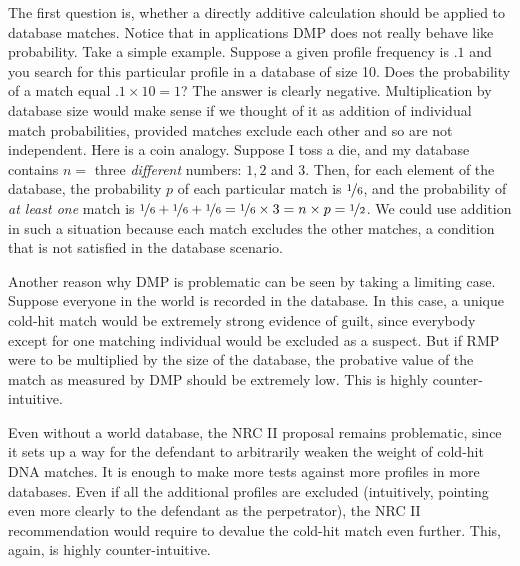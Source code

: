\documentclass[
  10pt,
  dvipsnames,enabledeprecatedfontcommands]{scrartcl}
\begin{document}
The first question is, whether a directly additive calculation should be
applied to database matches. Notice that in applications DMP does not
really behave like probability. Take a simple example. Suppose a given
profile frequency is \(.1\) and you search for this particular profile
in a database of size 10. Does the probability of a match equal
\(.1 \times 10=1\)? The answer is clearly negative. Multiplication by
database size would make sense if we thought of it as addition of
individual match probabilities, provided matches exclude each other and
so are not independent. Here is a coin analogy. Suppose I toss a die,
and my database contains \(n=\) three \emph{different} numbers: \(1, 2\)
and \(3\). Then, for each element of the database, the probability \(p\)
of each particular match is \(\nicefrac{1}{6}\), and the probability of
\emph{at least one} match is
\(\nicefrac{1}{6}+\nicefrac{1}{6}+\nicefrac{1}{6}=\nicefrac{1}{6}\times 3 = n\times p =\nicefrac{1}{2}\).
We could use addition in such a situation because each match excludes
the other matches, a condition that is not satisfied in the database
scenario.

Another reason why DMP is problematic can be seen by taking a limiting
case. Suppose everyone in the world is recorded in the database. In this
case, a unique cold-hit match would be extremely strong evidence of
guilt, since everybody except for one matching individual would be
excluded as a suspect. But if RMP were to be multiplied by the size of
the database, the probative value of the match as measured by DMP should
be extremely low. This is highly counter-intuitive.

Even without a world database, the NRC II proposal remains problematic,
since it sets up a way for the defendant to arbitrarily weaken the
weight of cold-hit DNA matches. It is enough to make more tests against
more profiles in more databases. Even if all the additional profiles are
excluded (intuitively, pointing even more clearly to the defendant as
the perpetrator), the NRC II recommendation would require to devalue the
cold-hit match even further. This, again, is highly counter-intuitive.
\end{document}
